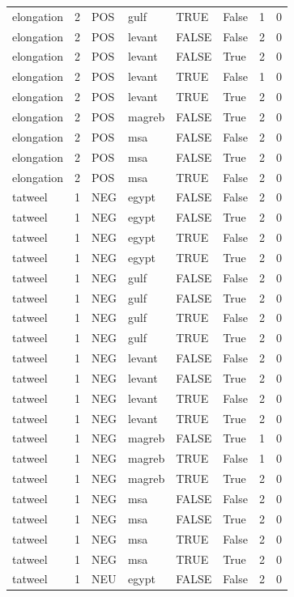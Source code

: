 \begin{tabular}{llllllrr}
elongation & 2 & POS & gulf & TRUE & False & 1 & 0 \\
elongation & 2 & POS & levant & FALSE & False & 2 & 0 \\
elongation & 2 & POS & levant & FALSE & True & 2 & 0 \\
elongation & 2 & POS & levant & TRUE & False & 1 & 0 \\
elongation & 2 & POS & levant & TRUE & True & 2 & 0 \\
elongation & 2 & POS & magreb & FALSE & True & 2 & 0 \\
elongation & 2 & POS & msa & FALSE & False & 2 & 0 \\
elongation & 2 & POS & msa & FALSE & True & 2 & 0 \\
elongation & 2 & POS & msa & TRUE & False & 2 & 0 \\
tatweel & 1 & NEG & egypt & FALSE & False & 2 & 0 \\
tatweel & 1 & NEG & egypt & FALSE & True & 2 & 0 \\
tatweel & 1 & NEG & egypt & TRUE & False & 2 & 0 \\
tatweel & 1 & NEG & egypt & TRUE & True & 2 & 0 \\
tatweel & 1 & NEG & gulf & FALSE & False & 2 & 0 \\
tatweel & 1 & NEG & gulf & FALSE & True & 2 & 0 \\
tatweel & 1 & NEG & gulf & TRUE & False & 2 & 0 \\
tatweel & 1 & NEG & gulf & TRUE & True & 2 & 0 \\
tatweel & 1 & NEG & levant & FALSE & False & 2 & 0 \\
tatweel & 1 & NEG & levant & FALSE & True & 2 & 0 \\
tatweel & 1 & NEG & levant & TRUE & False & 2 & 0 \\
tatweel & 1 & NEG & levant & TRUE & True & 2 & 0 \\
tatweel & 1 & NEG & magreb & FALSE & True & 1 & 0 \\
tatweel & 1 & NEG & magreb & TRUE & False & 1 & 0 \\
tatweel & 1 & NEG & magreb & TRUE & True & 2 & 0 \\
tatweel & 1 & NEG & msa & FALSE & False & 2 & 0 \\
tatweel & 1 & NEG & msa & FALSE & True & 2 & 0 \\
tatweel & 1 & NEG & msa & TRUE & False & 2 & 0 \\
tatweel & 1 & NEG & msa & TRUE & True & 2 & 0 \\
tatweel & 1 & NEU & egypt & FALSE & False & 2 & 0 \\

\end{tabular}
